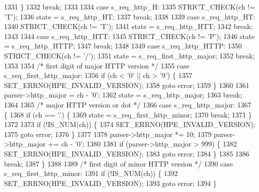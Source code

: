 \begin{DoxyCode}
1331         \}
1332         \textcolor{keywordflow}{break};
1333 
1334       \textcolor{keywordflow}{case} s_req_http_H:
1335         STRICT_CHECK(ch != \textcolor{charliteral}{'T'});
1336         state = s_req_http_HT;
1337         \textcolor{keywordflow}{break};
1338 
1339       \textcolor{keywordflow}{case} s_req_http_HT:
1340         STRICT_CHECK(ch != \textcolor{charliteral}{'T'});
1341         state = s_req_http_HTT;
1342         \textcolor{keywordflow}{break};
1343 
1344       \textcolor{keywordflow}{case} s_req_http_HTT:
1345         STRICT_CHECK(ch != \textcolor{charliteral}{'P'});
1346         state = s_req_http_HTTP;
1347         \textcolor{keywordflow}{break};
1348 
1349       \textcolor{keywordflow}{case} s_req_http_HTTP:
1350         STRICT_CHECK(ch != \textcolor{charliteral}{'/'});
1351         state = s_req_first_http_major;
1352         \textcolor{keywordflow}{break};
1353 
1354       \textcolor{comment}{/* first digit of major HTTP version */}
1355       \textcolor{keywordflow}{case} s_req_first_http_major:
1356         \textcolor{keywordflow}{if} (ch < '0' || ch > \textcolor{charliteral}{'9'}) \{
1357           SET_ERRNO(HPE_INVALID_VERSION);
1358           \textcolor{keywordflow}{goto} error;
1359         \}
1360 
1361         parser->http_major = ch - \textcolor{charliteral}{'0'};
1362         state = s_req_http_major;
1363         \textcolor{keywordflow}{break};
1364 
1365       \textcolor{comment}{/* major HTTP version or dot */}
1366       \textcolor{keywordflow}{case} s_req_http_major:
1367       \{
1368         \textcolor{keywordflow}{if} (ch == \textcolor{charliteral}{'.'}) \{
1369           state = s_req_first_http_minor;
1370           \textcolor{keywordflow}{break};
1371         \}
1372 
1373         \textcolor{keywordflow}{if} (!IS_NUM(ch)) \{
1374           SET_ERRNO(HPE_INVALID_VERSION);
1375           \textcolor{keywordflow}{goto} error;
1376         \}
1377 
1378         parser->http_major *= 10;
1379         parser->http_major += ch - \textcolor{charliteral}{'0'};
1380 
1381         \textcolor{keywordflow}{if} (parser->http_major > 999) \{
1382           SET_ERRNO(HPE_INVALID_VERSION);
1383           \textcolor{keywordflow}{goto} error;
1384         \}
1385 
1386         \textcolor{keywordflow}{break};
1387       \}
1388 
1389       \textcolor{comment}{/* first digit of minor HTTP version */}
1390       \textcolor{keywordflow}{case} s_req_first_http_minor:
1391         \textcolor{keywordflow}{if} (!IS_NUM(ch)) \{
1392           SET_ERRNO(HPE_INVALID_VERSION);
1393           \textcolor{keywordflow}{goto} error;
1394         \}

\end{DoxyCode}
